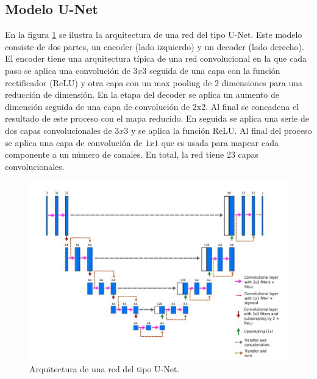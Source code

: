\subsection{Modelo U-Net}

En la figura \ref{fig:unet} se ilustra la arquitectura de una red del tipo U-Net. Este modelo consiste de dos partes, un encoder (lado izquierdo) y un decoder (lado derecho).  El encoder tiene una arquitectura típica de una red convolucional en la que cada paso se aplica una convolución de $3x3$ seguida de una capa con la función rectificador (ReLU) y otra capa con un max pooling de 2 dimensiones para una reducción de dimensión. En la etapa del decoder se aplica un aumento de dimensión seguida de una capa de convolución de 2x2. Al final se  concadena el resultado de este proceso con el mapa reducido. En seguida se aplica una serie de dos capas convolucionales de $3x3$ y se aplica la función ReLU. Al final del proceso se aplica una capa de convolución de $1x1$ que es usada para mapear cada componente a un número de canales. En total, la red tiene 23 capas convolucionales.

\begin{figure}[H]
    \centering
    \includegraphics[width=13cm]{Graphics/unet_model.jpg}
    \caption{Arquitectura de una red del tipo U-Net.}
    \label{fig:unet}
\end{figure}